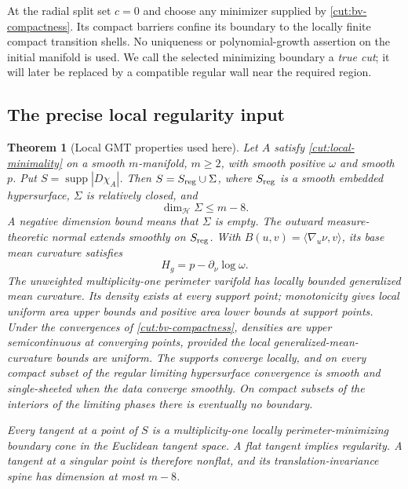 \documentclass[11pt]{article}
\numberwithin{equation}{section}
\newtheorem{theorem}{Theorem}[section]
\theoremstyle{definition}
\theoremstyle{remark}
\begin{document}
At the radial split set $c=0$ and choose any minimizer supplied by
\cref{cut:bv-compactness}.  Its compact barriers confine its boundary to
the locally finite compact transition shells.  No uniqueness or
polynomial-growth assertion on the initial manifold is used.  We call
the selected minimizing boundary a \emph{true cut}; it will later be
replaced by a compatible regular wall near the required region.

\subsection{The precise local regularity input}

\begin{theorem}[Local GMT properties used here]\label{cut:gmt}
Let $A$ satisfy \eqref{cut:local-minimality} on a smooth $m$-manifold,
$m\ge2$, with smooth positive $\omega$ and smooth $p$.  Put
$S=\operatorname{supp}|D\chi_A|$.  Then $S=S_{\rm reg}\cup\Sigma$, where $S_{\rm reg}$
is a smooth embedded hypersurface, $\Sigma$ is relatively closed, and
\begin{equation}\label{cut:singular-dimension}
                         \dim_{\mathcal H}\Sigma\le m-8.
\end{equation}
A negative dimension bound means that $\Sigma$ is empty.  The outward
measure-theoretic normal extends smoothly on $S_{\rm reg}$.  With
$B(u,v)=\langle\nabla_u\nu,v\rangle$, its base mean curvature satisfies
\begin{equation}\label{cut:base-mean-curvature}
                    H_g=p-\partial_\nu\log\omega.
\end{equation}
The unweighted multiplicity-one perimeter varifold has locally bounded
generalized mean curvature.  Its density exists at every support point;
monotonicity gives local uniform area upper bounds and positive area
lower bounds at support points.  Under the convergences of
\cref{cut:bv-compactness}, densities are upper semicontinuous at
converging points, provided the local generalized-mean-curvature bounds
are uniform.  The supports converge locally, and on every compact
subset of the regular limiting hypersurface convergence is smooth and
single-sheeted when the data converge smoothly.  On compact subsets of
the interiors of the limiting phases there is eventually no boundary.

Every tangent at a point of $S$ is a multiplicity-one locally
perimeter-minimizing boundary cone in the Euclidean tangent space.
A flat tangent implies regularity.  A tangent at a singular point is
therefore nonflat, and its translation-invariance spine has dimension
at most $m-8$.
\end{theorem}
\end{document}
